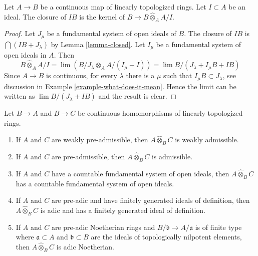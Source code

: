 \begin{lemma}
\label{lemma-closure-image-ideal}
Let $A \to B$ be a continuous map of linearly topologized rings.
Let $I \subset A$ be an ideal. The closure of $IB$
is the kernel of $B \to B \widehat{\otimes}_A A/I$.
\end{lemma}

\begin{proof}
Let $J_\mu$ be a fundamental system of open ideals of $B$.
The closure of $IB$ is $\bigcap (IB + J_\lambda)$ by Lemma \ref{lemma-closed}.
Let $I_\mu$ be a fundamental system of open ideals in $A$.
Then
$$
B \widehat{\otimes}_A A/I = \lim (B/J_\lambda \otimes_A A/(I_\mu + I)) =
\lim B/(J_\lambda + I_\mu B + I B)
$$
Since $A \to B$ is continuous, for every $\lambda$ there
is a $\mu$ such that $I_\mu B \subset J_\lambda$, see discussion in
Example \ref{example-what-does-it-mean}. Hence the limit
can be written as $\lim B/(J_\lambda + IB)$ and the result is clear.
\end{proof}

\begin{lemma}
\label{lemma-completed-tensor-product}
Let $B \to A$ and $B \to C$ be continuous homomorphisms of
linearly topologized rings.
\begin{enumerate}
\item If $A$ and $C$ are weakly pre-admissible, then
$A \widehat{\otimes}_B C$ is weakly admissible.
\item If $A$ and $C$ are pre-admissible, then
$A \widehat{\otimes}_B C$ is admissible.
\item If $A$ and $C$ have a countable fundamental system of open
ideals, then $A \widehat{\otimes}_B C$ has a countable fundamental
system of open ideals.
\item If $A$ and $C$ are pre-adic and have finitely generated ideals
of definition, then $A \widehat{\otimes}_B C$ is adic and has
a finitely generated ideal of definition.
\item If $A$ and $C$ are pre-adic Noetherian rings and
$B/\mathfrak b \to A/\mathfrak a$ is of finite type
where $\mathfrak a \subset A$ and $\mathfrak b \subset B$
are the ideals of topologically nilpotent elements, then
$A \widehat{\otimes}_B C$ is adic Noetherian.
\end{enumerate}
\end{lemma}

